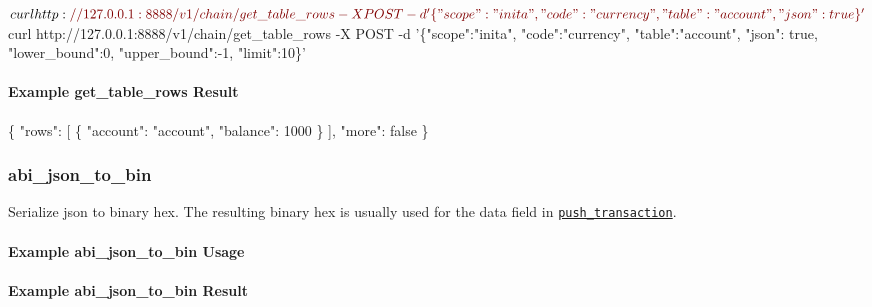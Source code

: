 \begin{DoxyCode}
$ curl  http:\textcolor{comment}{//127.0.0.1:8888/v1/chain/get\_table\_rows -X POST -d '\{"scope":"inita", "code":"currency",
       "table":"account", "json": true\}'}
$ curl  http:\textcolor{comment}{//127.0.0.1:8888/v1/chain/get\_table\_rows -X POST -d '\{"scope":"inita", "code":"currency",
       "table":"account", "json": true, "lower\_bound":0, "upper\_bound":-1, "limit":10\}'}
\end{DoxyCode}
\hypertarget{group__aaciorpc_examplegettablerowsresult}{}\paragraph{Example get\+\_\+table\+\_\+rows Result}\label{group__aaciorpc_examplegettablerowsresult}

\begin{DoxyCode}
\{
  \textcolor{stringliteral}{"rows"}: [
    \{
      \textcolor{stringliteral}{"account"}: \textcolor{stringliteral}{"account"},
      \textcolor{stringliteral}{"balance"}: 1000
    \}
  ],
  \textcolor{stringliteral}{"more"}: \textcolor{keyword}{false}
\}
\end{DoxyCode}
\hypertarget{group__aaciorpc_v1chaingeabijsontobin}{}\subsubsection{abi\+\_\+json\+\_\+to\+\_\+bin}\label{group__aaciorpc_v1chaingeabijsontobin}
Serialize json to binary hex. The resulting binary hex is usually used for the data field in \href{#v1chainpushtransaction}{\tt push\+\_\+transaction}.\hypertarget{group__aaciorpc_exampleabijsontobin}{}\paragraph{Example abi\+\_\+json\+\_\+to\+\_\+bin Usage}\label{group__aaciorpc_exampleabijsontobin}

\hypertarget{group__aaciorpc_exampleabijsontobinresult}{}\paragraph{Example abi\+\_\+json\+\_\+to\+\_\+bin Result}\label{group__aaciorpc_exampleabijsontobinresult}

